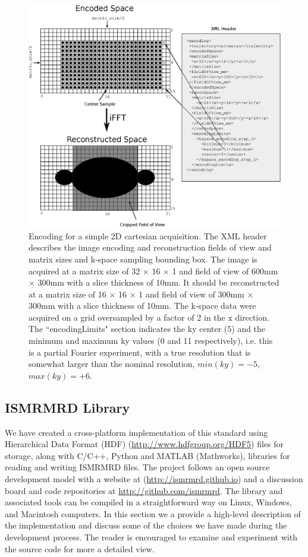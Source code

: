 \documentclass[12pt]{article}
\begin{document}
\begin{figure}
\begin{center}
\includegraphics[width=6in]{figure3_encoding_spaces.eps}
\caption{Encoding for a simple 2D cartesian acquisition.  The XML header describes the image encoding and reconstruction fields of view and matrix sizes and k-space sampling bounding box.  The image is acquired at a matrix size of 32 $\times$ 16 $\times$ 1 and field of view of 600mm $\times$ 300mm with a slice thickness of 10mm.  It should be reconstructed at a matrix size of 16 $\times$ 16 $\times$ 1 and field of view of 300mm $\times$ 300mm with a slice thickness of 10mm.   The k-space data were acquired on a grid oversampled by a factor of 2 in the x direction.  The ``encodingLimits" section indicates the ky center (5) and the minimum and maximum ky values (0 and 11 respectively), i.e. this is a partial Fourier experiment, with a true resolution that is somewhat larger than the nominal resolution, $min(ky)=-5$, $max(ky)=+6$.}
\label{fig:encoding}
\end{center}
\end{figure}


\subsection*{ISMRMRD Library}
We have created a cross-platform implementation of this standard using Hierarchical Data Format (HDF) (\url{http://www.hdfgroup.org/HDF5}) files for storage, along with C/C++, Python and MATLAB (Mathworks), libraries for reading and writing ISMRMRD files.  The project follows an open source development model with a website at (\url{http://ismrmrd.github.io}) and a discussion board and code repositories at \url{http://github.com/ismrmrd}.  The library and associated tools can be compiled in a straightforward way on Linux, Windows, and Macintosh computers.  In this section we a provide a high-level description of the implementation and discuss some of the choices we have made during the development process.  The reader is encouraged to examine and experiment with the source code for more a detailed view.
\end{document}
